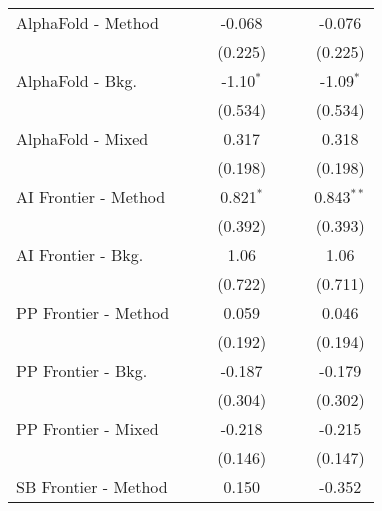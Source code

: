 \begin{tabular}{lcccccc}
   AlphaFold - Method           &             &             & -0.068      &              &             & -0.076\\   
                                &             &             & (0.225)     &              &             & (0.225)\\   
   AlphaFold - Bkg.             &             &             & -1.10$^{*}$ &              &             & -1.09$^{*}$\\   
                                &             &             & (0.534)     &              &             & (0.534)\\   
   AlphaFold - Mixed            &             &             & 0.317       &              &             & 0.318\\   
                                &             &             & (0.198)     &              &             & (0.198)\\   
   AI Frontier - Method         &             &             & 0.821$^{*}$ &              &             & 0.843$^{**}$\\   
                                &             &             & (0.392)     &              &             & (0.393)\\   
   AI Frontier - Bkg.           &             &             & 1.06        &              &             & 1.06\\   
                                &             &             & (0.722)     &              &             & (0.711)\\   
   PP Frontier - Method         &             &             & 0.059       &              &             & 0.046\\   
                                &             &             & (0.192)     &              &             & (0.194)\\   
   PP Frontier - Bkg.           &             &             & -0.187      &              &             & -0.179\\   
                                &             &             & (0.304)     &              &             & (0.302)\\   
   PP Frontier - Mixed          &             &             & -0.218      &              &             & -0.215\\   
                                &             &             & (0.146)     &              &             & (0.147)\\   
   SB Frontier - Method         &             &             & 0.150       &              &             & -0.352\\   

\end{tabular}
